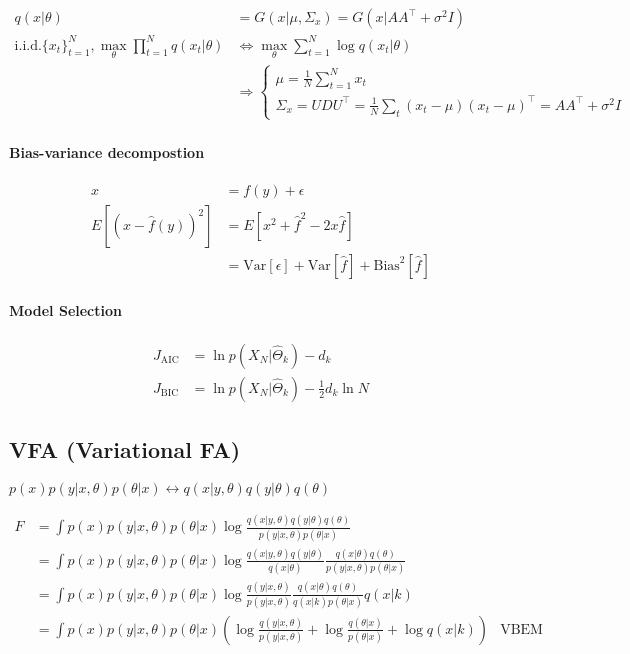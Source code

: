 \begin{align*}
	q(x|\theta) &= G(x|\mu,\Sigma_x) = G(x|AA^\top + \sigma^2 I)\\
	\text{i.i.d.} \{x_t\}_{t=1}^N, \max_\theta\prod_{t=1}^N q(x_t|\theta)&\Leftrightarrow\max_\theta\sum_{t=1}^N \log q(x_t|\theta)\\
	&\Rightarrow \begin{cases}
		\mu = \frac{1}{N}\sum_{t=1}^N x_t\\
		\Sigma_x =UDU^\top = \frac{1}{N}\sum_t (x_t-\mu)(x_t-\mu)^\top =AA^\top +\sigma^2 I
	\end{cases}
\end{align*}

\paragraph{Bias-variance decompostion}

\begin{align*}
	x &= f(y)+\epsilon \\
	E\left[\left(x-\hat{f}(y)\right)^2\right]&=E[x^2+\hat{f}^2-2x\hat{f}]\\
	&=\text{Var}[\epsilon]+\text{Var}[\hat{f}]+\text{Bias}^2[\hat{f}]
\end{align*}

\paragraph{Model Selection}

\begin{align*}
	J_\text{AIC}&=\ln p(X_N|\hat{\Theta}_k)-d_k\\
	J_\text{BIC}&=\ln p(X_N|\hat{\Theta}_k)-\frac{1}{2}d_k\ln N
\end{align*}

\subsection{VFA (Variational FA)}

$p(x)p(y|x,\theta)p(\theta|x)\leftrightarrow q(x|y,\theta)q(y|\theta)q(\theta)$

$$
\begin{aligned}
	F&=\int p(x)p(y|x,\theta)p(\theta|x)\log\frac{q(x|y,\theta)q(y|\theta)q(\theta)}{p(y|x,\theta)p(\theta|x)}\\
	&=\int p(x)p(y|x,\theta)p(\theta|x)\log\frac{q(x|y,\theta)q(y|\theta)}{q(x|\theta)}\frac{q(x|\theta)q(\theta)}{p(y|x,\theta)p(\theta|x)}\\
	&=\int p(x)p(y|x,\theta)p(\theta|x)\log\frac{q(y|x,\theta)}{p(y|x,\theta)}\frac{q(x|\theta)q(\theta)}{q(x|k)p(\theta|x)}q(x|k)\\
	&=\int p(x)p(y|x,\theta)p(\theta|x)\left(\log\frac{q(y|x,\theta)}{p(y|x,\theta)}+\log\frac{q(\theta|x)}{p(\theta|x)}+\log q(x|k)\right) & \text{VBEM}\\
\end{aligned}
$$

